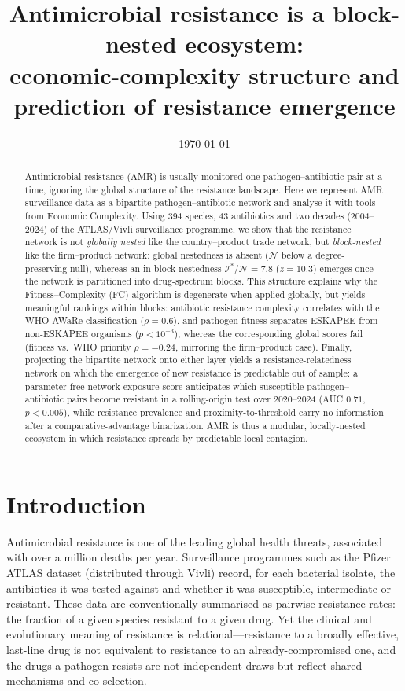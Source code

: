 \documentclass[11pt]{article}
\title{\textbf{Antimicrobial resistance is a block-nested ecosystem:\\
economic-complexity structure and prediction of resistance emergence}}
\date{\today}
\newcommand{\I}{\mathcal{I}}
\newcommand{\N}{\mathcal{N}}
\begin{document}
\maketitle

\begin{abstract}
\noindent
Antimicrobial resistance (AMR) is usually monitored one pathogen--antibiotic pair at a time,
ignoring the global structure of the resistance landscape. Here we represent AMR surveillance
data as a bipartite pathogen--antibiotic network and analyse it with tools from Economic Complexity.
Using \num{394} species, \num{43} antibiotics and two decades (2004--2024) of the ATLAS/Vivli
surveillance programme, we show that the resistance network is not \emph{globally nested} like the
country--product trade network, but \emph{block-nested} like the firm--product network: global
nestedness is absent ($\N$ below a degree-preserving null), whereas an in-block nestedness
$\I^\ast/\N=7.8$ ($z=10.3$) emerges once the network is partitioned into drug-spectrum blocks. This
structure explains why the Fitness--Complexity (FC) algorithm is degenerate when applied globally,
but yields meaningful rankings within blocks: antibiotic resistance complexity correlates with the
WHO AWaRe classification ($\rho=0.6$), and pathogen fitness separates ESKAPEE from non-ESKAPEE
organisms ($p<10^{-3}$), whereas the corresponding global scores fail (fitness vs.\ WHO priority
$\rho=-0.24$, mirroring the firm--product case). Finally, projecting the bipartite network onto
either layer yields a resistance-relatedness network on which the emergence of new resistance is
predictable out of sample: a parameter-free network-exposure score anticipates which susceptible
pathogen--antibiotic pairs become resistant in a rolling-origin test over 2020--2024 (AUC $0.71$,
$p<0.005$), while resistance prevalence and proximity-to-threshold carry no information after a
comparative-advantage binarization. AMR is thus
a modular, locally-nested ecosystem in which resistance spreads by predictable local contagion.
\end{abstract}

\section{Introduction}
Antimicrobial resistance is one of the leading global health threats, associated with over a million
deaths per year. Surveillance programmes such as the Pfizer ATLAS dataset (distributed through Vivli)
record, for each bacterial isolate, the antibiotics it was tested against and whether it was
susceptible, intermediate or resistant. These data are conventionally summarised as pairwise
resistance rates: the fraction of a given species resistant to a given drug. Yet the clinical and
evolutionary meaning of resistance is relational---resistance to a broadly effective, last-line drug
is not equivalent to resistance to an already-compromised one, and the drugs a pathogen resists are
not independent draws but reflect shared mechanisms and co-selection.
\end{document}
